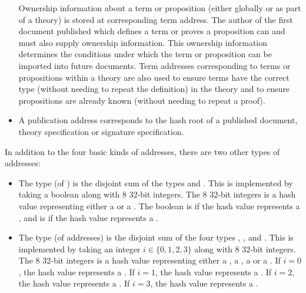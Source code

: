 \begin{itemize}
\begin{enumerate}
\end{enumerate}
Ownership information about a term or proposition (either globally or as part of a theory)
is stored at corresponding term address.
The author of the first document published which defines a term or proves a proposition can and must
also supply ownership information. This ownership information determines the conditions under
which the term or proposition can be imported into future documents.
Term addresses corresponding to terms or propositions within a theory are also used
to ensure terms have the correct type (without needing to repeat the definition) in the theory
and to ensure propositions are already known (without needing to repeat a proof).
\item {}
A publication address corresponds to the hash root of a published document, theory specification or signature specification.
\end{itemize}

In addition to the four basic kinds of addresses, there are two other types of addresses:
\begin{itemize}
\item {}
The type {} (of {}) is the disjoint sum of the types {} and {}.
This is implemented by taking a boolean along with 8 32-bit integers.
The 8 32-bit integers is a hash value representing either a {}
or a {}.
The boolean is {} if the hash value represents a {},
and is {} if the hash value represents a {}.
\item {}
The type {} (of addresses) is the disjoint sum of the four types
{}, {},
{} and {}.
This is implemented by taking an integer $i\in\{0,1,2,3\}$ along with 8 32-bit integers.
The 8 32-bit integers is a hash value representing either a {}, a {},
a {} or a {}.
If $i=0$, the hash value represents a {}.
If $i=1$, the hash value represents a {}.
If $i=2$, the hash value represents a {}.
If $i=3$, the hash value represents a {}.
\end{itemize}

